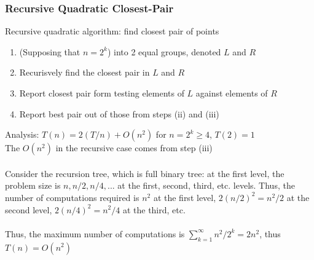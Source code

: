 \documentclass{article}
\begin{document}
			\subsubsection{Recursive Quadratic Closest-Pair}
				Recursive quadratic algorithm: find closest pair of points
				\begin{enumerate}[i]
					\item (Supposing that $n = 2^k$) into 2 equal groups, denoted $L$ and $R$
					\item Recurisvely find the closest pair in $L$ and $R$
					\item Report closest pair form testing elements of $L$ against elements of $R$
					\item Report best pair out of those from steps (ii) and (iii)
					\end{enumerate}
				Analysis: $T(n) = 2(T/n) + O(n^2)$ for $n = 2^k \geq 4$, $T(2) = 1$ \\
				The $O(n^2)$ in the recursive case comes from step (iii) \\
				\\
				Consider the recursion tree, which is full binary tree: at the first level, the problem size is $n, n/2, n/4, ...$ at the first, second, third, etc. levels. Thus, the number of computations required is $n^2$ at the first level, $2(n/2)^2 = n^2/2$ at the second level, $2(n/4)^2 = n^2/4$ at the third, etc. \\
				\\
				Thus, the maximum number of computations is $\sum_{k = 1}^\infty n^2/2^k = 2n^2$, thus $T(n) = O(n^2)$
\end{document}
